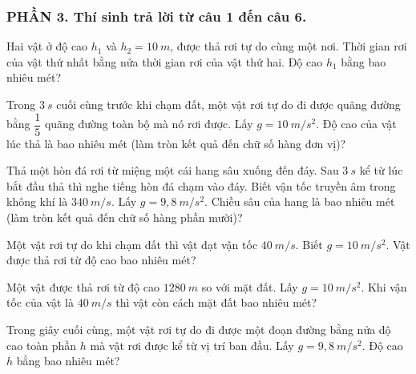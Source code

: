 \subsubsection*{PHẦN 3. Thí sinh trả lời từ câu 1 đến câu 6.}
\setcounter{ex}{0} 
\begin{ex}%
Hai vật ở độ cao $h_1$ và $h_2=10\ m$, được thả rơi tự do cùng một nơi. Thời gian rơi của vật thứ nhất bằng nửa thời gian rơi của vật thứ hai. Độ cao $h_1$ bằng bao nhiêu mét?
\loigiai{}
\end{ex}
\begin{ex}%
Trong $3\ s$ cuối cùng trước khi chạm đất, một vật rơi tự do đi được quãng đường bằng $\dfrac{1}{5}$ quãng đường toàn bộ mà nó rơi được. Lấy $g=10\ m/s^2$. Độ cao của vật lúc thả là bao nhiêu mét (làm tròn kết quả đến chữ số hàng đơn vị)? 
\loigiai{}
\end{ex}
\begin{ex}%
Thả một hòn đá rơi từ miệng một cái hang sâu xuống đến đáy. Sau $3\ s$ kể từ lúc bắt đầu thả thì nghe tiếng hòn đá chạm vào đáy. Biết vận tốc truyền âm trong không khí là $340\ m/s$. Lấy $g=9,8\ m/s^2$. Chiều sâu của hang là bao nhiêu mét (làm tròn kết quả đến chữ số hàng phần mười)?
\loigiai{
}
\end{ex}

\begin{ex}%
Một vật rơi tự do khi chạm đất thì vật đạt vận tốc $40\ m/s$. Biết $g=10\ m/s^2$. Vật được thả rơi từ độ cao bao nhiêu mét? 
\loigiai{}
\end{ex}

\begin{ex}%
Một vật được thả rơi từ độ cao $1280\ m$ so với mặt đất. Lấy $g=10\ m/s^2$. Khi vận tốc của vật là $40\ m/s$ thì vật còn cách mặt đất bao nhiêu mét?
\loigiai{}
\end{ex}
\begin{ex}%
Trong giây cuối cùng, một vật rơi tự do đi được một đoạn đường bằng nửa độ cao toàn phần $h$ mà vật rơi được kể từ vị trí ban đầu. Lấy $g=9,8\ m/s^2$. Độ cao $h$ bằng bao nhiêu mét? 
\loigiai{}
\end{ex}







